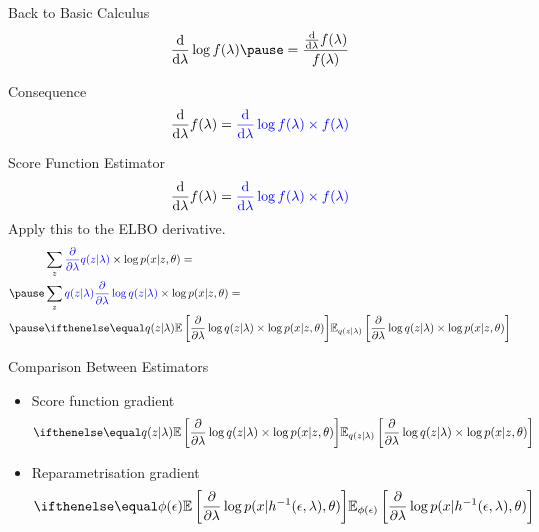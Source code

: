 \documentclass[14pt]{beamer}
\begin{document}
\begin{frame}{Back to Basic Calculus}
\begin{equation*}
\dv{\lambda}\log f(\lambda) \pause = \frac{\dv{\lambda}f(\lambda)}{f(\lambda)}
\end{equation*}
\pause
\begin{block}{Consequence}
\begin{equation*}
\dv{\lambda}f(\lambda) = \textcolor{blue}{\dv{\lambda}\log f(\lambda) \times f(\lambda)}
\end{equation*}
\end{block}
\end{frame}

\begin{frame}{Score Function Estimator}
\begin{equation*}
\dv{\lambda}f(\lambda) = \textcolor{blue}{\dv{\lambda}\log f(\lambda) \times f(\lambda)}
\end{equation*}
\pause
Apply this to the ELBO derivative.
\begin{equation*}
\begin{aligned}
&\sum_{z}\textcolor{blue}{\frac{\partial}{\partial \lambda}q(z|\lambda)}\times\log p(x|z,\theta) = \\
\pause
&\sum_{z}\textcolor{blue}{q(z|\lambda)\frac{\partial}{\partial \lambda}\log q(z|\lambda)} \times \log p(x|z,\theta) = \\
\pause
&\E[q(z|\lambda)]{\frac{\partial}{\partial \lambda}\log q(z|\lambda) \times \log p(x|z,\theta)}
\end{aligned}
\end{equation*}
\end{frame}

\begin{frame}{Comparison Between Estimators}
\begin{itemize}
\item Score function gradient
\begin{equation*}
\E[q(z|\lambda)]{\frac{\partial}{\partial \lambda}\log q(z|\lambda) \times \log p(x|z,\theta)}
\end{equation*}
\item Reparametrisation gradient
\begin{equation*}
\E[\phi(\epsilon)]{\frac{\partial}{\partial \lambda} \log p(x|h^{-1}(\epsilon, \lambda),\theta)}
\end{equation*}
\end{itemize}
\end{frame}
\end{document}
